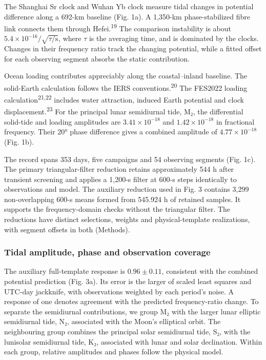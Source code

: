 \documentclass[
  11pt,
  a4paper,
]{article}
\begin{document}
The Shanghai Sr clock and Wuhan Yb clock measure tidal changes in
potential difference along a 692-km baseline (Fig. 1a). A 1,350-km
phase-stabilized fibre link connects them through
Hefei.\textsuperscript{19} The comparison instability is about
\(5.4\times10^{-16}/\sqrt{\tau/\mathrm{s}}\), where \(\tau\) is the
averaging time, and is dominated by the clocks. Changes in their
frequency ratio track the changing potential, while a fitted offset for
each observing segment absorbs the static contribution.

Ocean loading contributes appreciably along the coastal--inland
baseline. The solid-Earth calculation follows the IERS
conventions.\textsuperscript{20} The FES2022 loading
calculation\textsuperscript{21,22} includes water attraction, induced
Earth potential and clock displacement.\textsuperscript{23} For the
principal lunar semidiurnal tide, M₂, the differential solid-tide and
loading amplitudes are \(3.41\times10^{-18}\) and \(1.42\times10^{-18}\)
in fractional frequency. Their 20° phase difference gives a combined
amplitude of \(4.77\times10^{-18}\) (Fig. 1b).

The record spans 353 days, five campaigns and 54 observing segments
(Fig. 1c). The primary triangular-filter reduction retains approximately
544 h after transient screening and applies a 1,200-s filter at 600-s
steps identically to observations and model. The auxiliary reduction
used in Fig. 3 contains 3,299 non-overlapping 600-s means formed from
545.924 h of retained samples. It supports the frequency-domain checks
without the triangular filter. The reductions have distinct selections,
weights and physical-template realizations, with segment offsets in both
(Methods).

\hypertarget{tidal-amplitude-phase-and-observation-coverage}{%
\subsubsection{Tidal amplitude, phase and observation
coverage}\label{tidal-amplitude-phase-and-observation-coverage}}

The auxiliary full-template response is \(0.96\pm0.11\), consistent with
the combined potential prediction (Fig. 3a). Its error is the larger of
scaled least squares and UTC-day jackknife, with observations weighted
by each period's noise. A response of one denotes agreement with the
predicted frequency-ratio change. To separate the semidiurnal
contributions, we group M₂ with the larger lunar elliptic semidiurnal
tide, N₂, associated with the Moon's elliptical orbit. The neighbouring
group combines the principal solar semidiurnal tide, S₂, with the
lunisolar semidiurnal tide, K₂, associated with lunar and solar
declination. Within each group, relative amplitudes and phases follow
the physical model.
\end{document}
